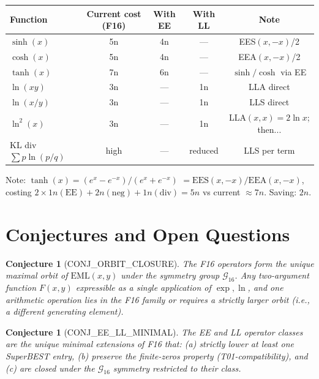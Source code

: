 \documentclass[11pt]{article}
\newtheorem{conjecture}[theorem]{Conjecture}
\begin{document}
\begin{center}
\begin{tabular}{lcccc}
\toprule
Function & Current cost (F16) & With EE & With LL & Note \\
\midrule
$\sinh(x)$     & 5n & 4n & --- & EES$(x,-x)$/2 \\
$\cosh(x)$     & 5n & 4n & --- & EEA$(x,-x)$/2 \\
$\tanh(x)$     & 7n & 6n & --- & $\sinh/\cosh$ via EE \\
$\ln(xy)$      & 3n & --- & 1n & LLA direct \\
$\ln(x/y)$     & 3n & --- & 1n & LLS direct \\
$\ln^2(x)$     & 3n & --- & 1n & LLA$(x,x)=2\ln x$; then... \\
KL div $\sum p\ln(p/q)$ & high & --- & reduced & LLS per term \\
\bottomrule
\end{tabular}
\end{center}

\noindent Note: $\tanh(x) = (e^x - e^{-x})/(e^x + e^{-x})$
$= \mathrm{EES}(x,-x)/\mathrm{EEA}(x,-x)$, costing $2 \times 1n(\mathrm{EE})
+ 2n(\mathrm{neg}) + 1n(\mathrm{div}) = 5n$ vs current $\approx 7n$. Saving: $2n$.

\section{Conjectures and Open Questions}
\label{sec:conjectures}

\begin{conjecture}[CONJ\_ORBIT\_CLOSURE]
The F16 operators form the unique maximal orbit of $\mathrm{EML}(x,y)$ under
the symmetry group $\mathcal{G}_{16}$.
Any two-argument function $F(x,y)$ expressible as a single application of
$\exp, \ln$, and one arithmetic operation lies in the F16 family or requires
a strictly larger orbit (i.e., a different generating element).
\end{conjecture}

\begin{conjecture}[CONJ\_EE\_LL\_MINIMAL]
The EE and LL operator classes are the unique minimal extensions of F16 that:
(a) strictly lower at least one SuperBEST entry,
(b) preserve the finite-zeros property (T01-compatibility), and
(c) are closed under the $\mathcal{G}_{16}$ symmetry restricted to their class.
\end{conjecture}
\end{document}
